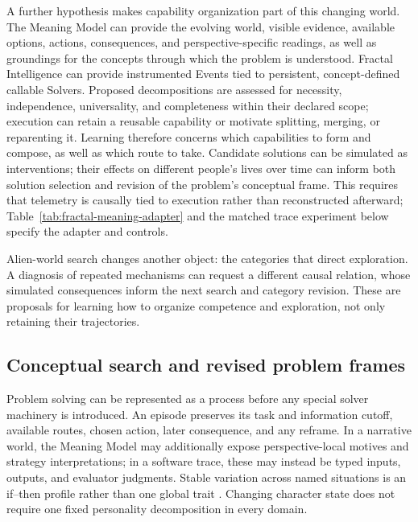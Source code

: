 \documentclass[10pt]{article}
\begin{document}
A further hypothesis makes capability organization part of this changing
world. The Meaning Model can provide the evolving world, visible evidence,
available options, actions, consequences, and perspective-specific readings,
as well as groundings for the concepts through which the problem is understood.
Fractal Intelligence can provide instrumented Events tied to persistent,
concept-defined callable Solvers. Proposed decompositions are assessed for
necessity, independence, universality, and completeness within their declared
scope; execution can retain
a reusable capability or motivate splitting, merging, or reparenting it.
Learning therefore concerns which capabilities to form and compose, as well
as which route to take. Candidate solutions can be simulated as interventions;
their effects on different people's lives over time can inform both solution
selection and revision of the problem's conceptual frame. This requires that telemetry is causally tied to
execution rather than reconstructed afterward; Table~\ref{tab:fractal-meaning-adapter}
and the matched trace experiment below specify the adapter and controls.

Alien-world search changes another object:
the categories that direct exploration. A diagnosis of repeated mechanisms can
request a different causal relation, whose simulated consequences inform the
next search and category revision. These are proposals for learning how to
organize competence and exploration, not only retaining their trajectories.

\subsection{Conceptual search and revised problem frames}
\label{sec:conceptual-search}

Problem solving can be represented as a process before any special solver
machinery is introduced. An episode preserves its task and information cutoff,
available routes, chosen action, later consequence, and any reframe. In a
narrative world, the Meaning Model may additionally expose perspective-local motives
and strategy interpretations; in a software trace, these may instead be typed
inputs, outputs, and evaluator judgments. Stable variation across named
situations is an if--then profile rather than one global trait
\cite{shoda1994signatures,mischelShoda1995caps}. Changing character state does
not require one fixed personality decomposition in every domain.
\end{document}
